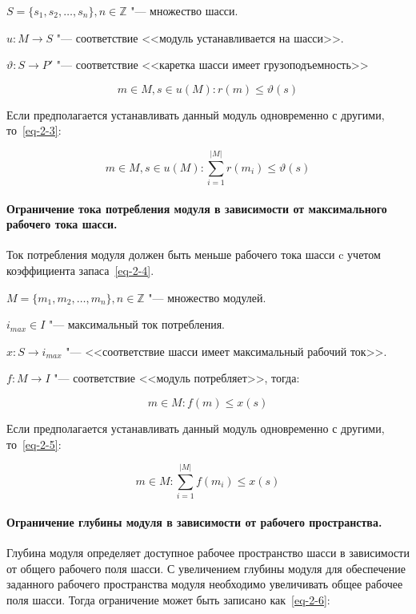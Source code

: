 \noindent $S = \{s_1, s_2, \ldots, s_n\}, n \in \mathbb{Z}$ "--- множество шасси.

\noindent $u: M \rightarrow S$ "--- соответствие <<модуль устанавливается  на шасси>>. 

\noindent $\vartheta: S \rightarrow P'$ "--- соответствие <<каретка шасси имеет грузоподъемность>> 

\begin{equation}
m \in M, s \in u(M): r(m) \leq \vartheta(s)
\label{eq-2-2}
\end{equation}

Если предполагается устанавливать данный модуль одновременно с другими, то~\cref{eq-2-3}:

\begin{equation}
m \in M, s \in u(M): \sum_{i=1}^{|M|}r(m_i) \leq \vartheta(s)
\label{eq-2-3}
\end{equation}

\paragraph{Ограничение тока потребления модуля в зависимости от максимального рабочего тока шасси.} Ток потребления модуля должен быть меньше рабочего тока шасси c учетом коэффициента запаса~\cref{eq-2-4}.

\noindent $M = \{m_1, m_2, \ldots, m_n\}, n \in \mathbb{Z} $ "--- множество модулей.

\noindent $i_{max} \in I$ "--- максимальный ток потребления.

\noindent $x: S \rightarrow i_{max}$ "--- <<соответствие шасси имеет максимальный рабочий ток>>.

\noindent $f: M \rightarrow I$ "--- соответствие <<модуль потребляет>>, тогда:

\begin{equation}
m \in M: f(m) \leq x(s)
\label{eq-2-4}
\end{equation}

Если предполагается устанавливать данный модуль одновременно с другими, то~\cref{eq-2-5}:

\begin{equation}
m \in M: \sum_{i=1}^{|M|}f(m_i) \leq x(s)
\label{eq-2-5}
\end{equation}

\paragraph{Ограничение глубины модуля в зависимости от рабочего пространства.} Глубина модуля определяет доступное рабочее пространство шасси в зависимости от общего рабочего поля шасси. С увеличением глубины модуля для обеспечение заданного рабочего пространства модуля необходимо увеличивать общее рабочее поля шасси. Тогда ограничение может быть записано как~\cref{eq-2-6}:

